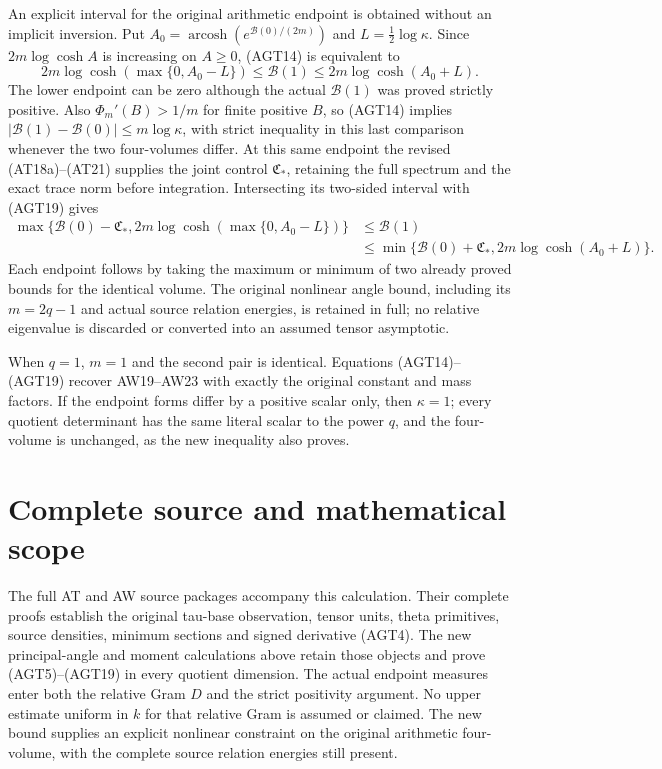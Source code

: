 An explicit interval for the original arithmetic endpoint is
obtained without an implicit inversion. Put
$A_0=\operatorname{arcosh}(e^{\mathcal B(0)/(2m)})$
and $L=\tfrac12\log\kappa$. Since $2m\log\cosh A$ is
increasing on $A\ge0$, (AGT14) is equivalent to
\[
 2m\log\cosh(\max\{0,A_0-L\})
 \le\mathcal B(1)\le2m\log\cosh(A_0+L).
 \tag{AGT19}
\]
The lower endpoint can be zero although the actual
$\mathcal B(1)$ was proved strictly positive.
Also $\Phi_m'(B)>1/m$ for finite positive $B$, so (AGT14)
implies $|\mathcal B(1)-\mathcal B(0)|\le m\log\kappa$,
with strict inequality in this last comparison whenever
the two four-volumes differ. At this same endpoint the revised
(AT18a)--(AT21) supplies the joint control $\mathfrak C_*$,
retaining the full spectrum and the exact trace norm before
integration. Intersecting its two-sided interval with (AGT19) gives
\[
\begin{aligned}
\max\{\mathcal B(0)-\mathfrak C_*,
 2m\log\cosh(\max\{0,A_0-L\})\}
&\le\mathcal B(1)\\
&\le\min\{\mathcal B(0)+\mathfrak C_*,
                    2m\log\cosh(A_0+L)\}.
\end{aligned}\tag{AGT19a}
\]
Each endpoint follows by taking the maximum or minimum of two
already proved bounds for the identical volume. The original
nonlinear angle bound, including its $m=2q-1$ and actual source
relation energies, is retained in full; no relative eigenvalue is
discarded or converted into an assumed tensor asymptotic.

When $q=1$, $m=1$ and the second pair is identical.
Equations (AGT14)--(AGT19) recover AW19--AW23 with exactly
the original constant and mass factors. If the endpoint
forms differ by a positive scalar only, then $\kappa=1$;
every quotient determinant has the same literal scalar to
the power $q$, and the four-volume is unchanged, as the
new inequality also proves.

\section{Complete source and mathematical scope}

The full AT and AW source packages accompany this calculation.
Their complete proofs establish the original tau-base
observation, tensor units, theta primitives, source densities,
minimum sections and signed derivative (AGT4).
The new principal-angle and moment calculations above retain
those objects and prove (AGT5)--(AGT19) in every quotient
dimension. The actual endpoint measures enter both the
relative Gram $D$ and the strict positivity argument.
No upper estimate uniform in $k$ for that relative Gram
is assumed or claimed. The new bound supplies an explicit
nonlinear constraint on the original arithmetic four-volume,
with the complete source relation energies still present.
